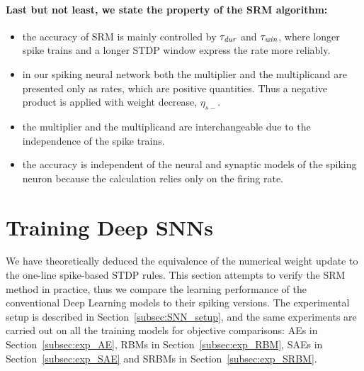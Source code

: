 
\paragraph{Last but not least, we state the property of the SRM algorithm:}
\begin{itemize}
	\item the accuracy of SRM is mainly controlled by $\tau_{\textit{\textrm{dur}}}$ and $\tau_{\textit{\textrm{win}}}$, where longer spike trains and a longer STDP window express the rate more reliably.
	\item in our spiking neural network both the multiplier and the multiplicand are presented only as rates, which are positive quantities.
	Thus a negative product is applied with weight decrease, $\eta_{s-}$. 
	\item the multiplier and the multiplicand are interchangeable due to the independence of the spike trains. 
	\item the accuracy is independent of the neural and synaptic models of the spiking neuron because the calculation relies only on the firing rate.
\end{itemize}


\section{Training Deep SNNs}
\label{sec:dSNN}
We have theoretically deduced the equivalence of the numerical weight update to the one-line spike-based STDP rules.
This section attempts to verify the SRM method in practice, thus we compare the learning performance of the conventional Deep Learning models to their spiking versions.
The experimental setup is described in Section~\ref{subsec:SNN_setup}, and the same experiments are carried out on all the training models for objective comparisons: AEs in Section~\ref{subsec:exp_AE}, RBMs in Section~\ref{subsec:exp_RBM}, SAEs in Section~\ref{subsec:exp_SAE} and SRBMs in Section~\ref{subsec:exp_SRBM}.

